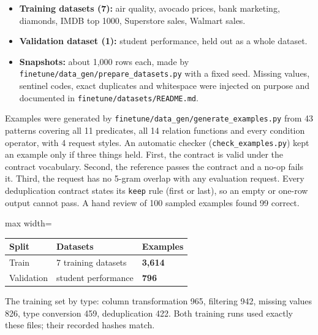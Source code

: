 \documentclass[11pt]{article}
\providecommand{\tightlist}{\setlength{\itemsep}{0pt}\setlength{\parskip}{0pt}}
\begin{document}
\begin{itemize}
\tightlist
\item
  \textbf{Training datasets (7):} air quality, avocado prices, bank
  marketing, diamonds, IMDB top 1000, Superstore sales, Walmart sales.
\item
  \textbf{Validation dataset (1):} student performance, held out as a
  whole dataset.
\item
  \textbf{Snapshots:} about 1,000 rows each, made by
  \texttt{finetune/\allowbreak{}data\_\allowbreak{}gen/\allowbreak{}prepare\_\allowbreak{}datasets.\allowbreak{}py}
  with a fixed seed. Missing values, sentinel codes, exact duplicates
  and whitespace were injected on purpose and documented in
  \texttt{finetune/\allowbreak{}datasets/\allowbreak{}README.\allowbreak{}md}.
\end{itemize}

Examples were generated by
\texttt{finetune/\allowbreak{}data\_\allowbreak{}gen/\allowbreak{}generate\_\allowbreak{}examples.\allowbreak{}py}
from 43 patterns covering all 11 predicates, all 14 relation functions
and every condition operator, with 4 request styles. An automatic
checker (\texttt{check\_\allowbreak{}examples.\allowbreak{}py}) kept an
example only if three things held. First, the contract is valid under
the contract vocabulary. Second, the reference passes the contract and a
no-op fails it. Third, the request has no 5-gram overlap with any
evaluation request. Every deduplication contract states its
\texttt{keep} rule (first or last), so an empty or one-row output cannot
pass. A hand review of 100 sampled examples found 99 correct.

\vspace{4pt}\begin{center}
\footnotesize\setlength{\tabcolsep}{3pt}\renewcommand{\arraystretch}{1.1}
\begin{adjustbox}{max width=\columnwidth}\begin{tabular}{lll}
\toprule
\textbf{Split} & \textbf{Datasets} & \textbf{Examples} \\
\midrule
Train & 7 training datasets & \textbf{3,614} \\
Validation & student performance & \textbf{796} \\
\bottomrule
\end{tabular}\end{adjustbox}
\end{center}\vspace{2pt}

The training set by type: column transformation 965, filtering 942,
missing values 826, type conversion 459, deduplication 422. Both
training runs used exactly these files; their recorded hashes match.
\end{document}
